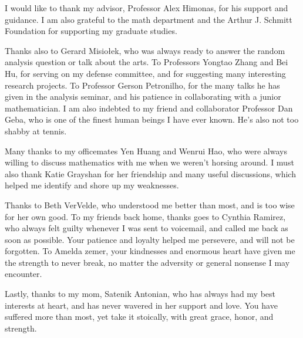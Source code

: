 \documentclass[final,noinfo]{thesis}
\begin{document}
\tableofcontents



\begin{acknowledge}I would like to thank my advisor, Professor Alex Himonas,
    for his support and guidance. I am also grateful to the math department and the  Arthur J. Schmitt
    Foundation for supporting my graduate studies. 

    Thanks also to Gerard Misio{\l}ek, who was always ready to answer the
    random analysis question or talk about the arts. To Professors Yongtao
    Zhang and Bei Hu, for serving on my defense committee, and for suggesting
    many interesting research projects. To Professor Gerson
    Petronilho, for the many talks he has given in the analysis seminar, and
    his patience in collaborating with a junior mathematician. I am also
    indebted to my friend and collaborator Professor Dan Geba, who is one of
    the finest human beings I have ever known. He's also not too shabby at
    tennis. 

    Many thanks to my officemates Yen Huang and Wenrui Hao, who were always
    willing to discuss mathematics with me when we weren't horsing around. I
    must also thank Katie Grayshan for her friendship and many useful
    discussions, which helped me identify and shore up my weaknesses. 

    Thanks to Beth VerVelde, who understood me better than most, and is too
    wise for her own good. To my friends back home, thanks goes to Cynthia
    Ramirez, who always felt guilty whenever I was sent to voicemail, and
    called me back as soon as possible. Your patience and loyalty helped me
    persevere, and will not be forgotten. To Amelda zemer, your kindnesses and
    enormous heart have given me the strength to never break, no matter the
    adversity or general nonsense I may encounter.
    
    Lastly, thanks to my mom, Satenik Antonian, who has always had my best
    interests at heart, and has never wavered in her support and love. You have
    suffered more than most, yet take it stoically, with great grace, honor,
    and strength.    
  \end{acknowledge}
\end{document}
